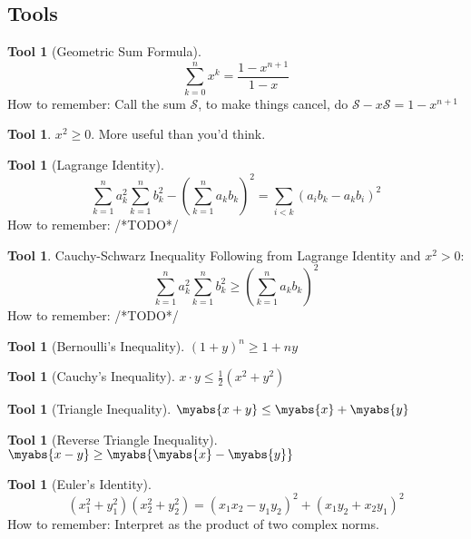 \documentclass[12pt]{amsart}
\theoremstyle{definition}
\newtheorem{tool}[theorem]{Tool}
\begin{document}
\subsection{Tools}
\begin{tool}[Geometric Sum Formula]
    \begin{equation*}
        \sum_{k=0}^nx^k = \frac{1-x^{n+1}}{1-x}
    \end{equation*}
    How to remember: Call the sum $\mathcal{S}$, to make things cancel, do
    $\mathcal{S}-x\mathcal{S} = 1-x^{n+1}$
\end{tool}
\begin{tool} $x^2 \geq 0$. More useful than you'd think. \end{tool}
\begin{tool}[Lagrange Identity]
    \begin{equation*}
        \sum_{k=1}^n a_k^2 \sum_{k=1}^n b_k^2
        - \left(\sum_{k=1}^n a_k b_k \right)^2
        = \sum_{i<k}(a_ib_k-a_kb_i)^2
    \end{equation*}
    How to remember: /*TODO*/
\end{tool}
\begin{tool}{Cauchy-Schwarz Inequality}
    Following from Lagrange Identity and $x^2 > 0$:
    \begin{equation*}
        \sum_{k=1}^n a_k^2 \sum_{k=1}^n b_k^2
        \geq \left(\sum_{k=1}^n a_k b_k \right)^2
    \end{equation*}
    How to remember: /*TODO*/
\end{tool}
\begin{tool}[Bernoulli's Inequality]
    $(1+y)^n \geq 1 + ny$
\end{tool}
\begin{tool}[Cauchy's Inequality]
    $x\cdot y \leq \frac{1}{2}(x^2+y^2)$
\end{tool}
\begin{tool}[Triangle Inequality]
    $\myabs{x+y} \leq \myabs{x}+\myabs{y}$
\end{tool}
\begin{tool}[Reverse Triangle Inequality]
    $\myabs{x-y} \geq \myabs{\myabs{x}-\myabs{y}}$
\end{tool}
\begin{tool}[Euler's Identity]
    \begin{equation*}
        (x_1^2+y_1^2)(x_2^2+y_2^2) =
        {(x_1x_2-y_1y_2)}^2+{(x_1y_2+x_2y_1)}^2
    \end{equation*}
    How to remember: Interpret as the product of two complex norms.
\end{tool}
\end{document}
